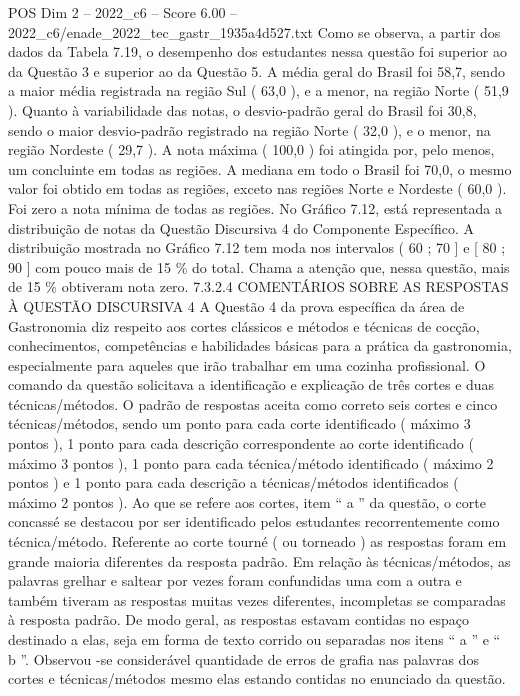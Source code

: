 \begin{textsample}{POS Dim 2 – 2022\_c6 – Score 6.00 – 2022\_c6/enade\_2022\_tec\_gastr\_1935a4d527.txt}
Como se observa, a partir dos dados da Tabela 7.19, o desempenho dos estudantes nessa questão foi superior ao da Questão 3 e superior ao da Questão 5.
A média geral do Brasil foi 58,7, sendo a maior média registrada na região Sul ( 63,0 ), e a menor, na região Norte ( 51,9 ).
Quanto à variabilidade das notas, o desvio-padrão geral do Brasil foi 30,8, sendo o maior desvio-padrão registrado na região Norte ( 32,0 ), e o menor, na região Nordeste ( 29,7 ).
A nota máxima ( 100,0 ) foi atingida por, pelo menos, um concluinte em todas as regiões.
A mediana em todo o Brasil foi 70,0, o mesmo valor foi obtido em todas as regiões, exceto nas regiões Norte e Nordeste ( 60,0 ).
Foi zero a nota mínima de todas as regiões.
No Gráfico 7.12, está representada a distribuição de notas da Questão Discursiva 4 do Componente Específico.
A distribuição mostrada no Gráfico 7.12 tem moda nos intervalos ( 60 ; 70 ] e [ 80 ; 90 ] com pouco mais de 15 \% do total.
Chama a atenção que, nessa questão, mais de 15 \% obtiveram nota zero. 7.3.2.4 COMENTÁRIOS SOBRE AS RESPOSTAS À QUESTÃO DISCURSIVA 4 A Questão 4 da prova específica da área de Gastronomia diz respeito aos cortes clássicos e métodos e técnicas de cocção, conhecimentos, competências e habilidades básicas para a prática da gastronomia, especialmente para aqueles que irão trabalhar em uma cozinha profissional.
O comando da questão solicitava a identificação e explicação de três cortes e duas técnicas/métodos.
O padrão de respostas aceita como correto seis cortes e cinco técnicas/métodos, sendo um ponto para cada corte identificado ( máximo 3 pontos ), 1 ponto para cada descrição correspondente ao corte identificado ( máximo 3 pontos ), 1 ponto para cada técnica/método identificado ( máximo 2 pontos ) e 1 ponto para cada descrição a técnicas/métodos identificados ( máximo 2 pontos ).
Ao que se refere aos cortes, item “ a ” da questão, o corte concassé se destacou por ser identificado pelos estudantes recorrentemente como técnica/método.
Referente ao corte tourné ( ou torneado ) as respostas foram em grande maioria diferentes da resposta padrão.
Em relação às técnicas/métodos, as palavras grelhar e saltear por vezes foram confundidas uma com a outra e também tiveram as respostas muitas vezes diferentes, incompletas se comparadas à resposta padrão.
De modo geral, as respostas estavam contidas no espaço destinado a elas, seja em forma de texto corrido ou separadas nos itens “ a ” e “ b ”.
Observou -se considerável quantidade de erros de grafia nas palavras dos cortes e técnicas/métodos mesmo elas estando contidas no enunciado da questão.

\end{textsample}
